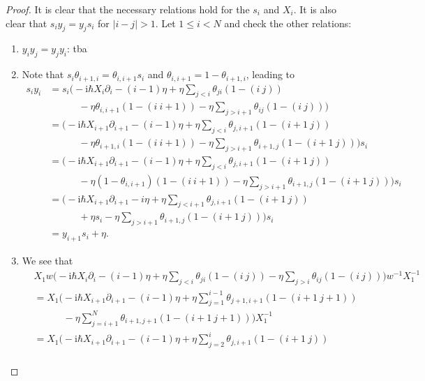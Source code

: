 \documentclass[11pt]{report}
\theoremstyle{definition}
\theoremstyle{remark}
\theoremstyle{remark}
\newcommand{\I}{\mathrm{i}}
\begin{document}
\begin{proof}
It is clear that the necessary relations hold for the $s_i$ and $X_i$. It is also clear that $s_i y_j = y_j s_i$ for $|i-j|>1$. Let $1 \leq i < N$ and check the other relations:
\begin{enumerate}[label=(\roman*)]
\item $y_i y_j = y_j y_i$: tba
\item Note that $s_i \theta_{i+1,i} = \theta_{i,i+1} s_i$ and $\theta_{i,i+1} = 1 - \theta_{i+1,i}$, leading to
\begin{align*}
s_i y_i
&= s_i \bigg( -\I \hbar X_i \partial_i - (i-1) \eta + \eta \sum_{j < i} \theta_{ji} (1-(i \ j)) \\
&\quad \quad \quad - \eta \theta_{i,i+1} (1-(i \ i+1)) - \eta \sum_{j > i+1} \theta_{ij} (1-(i \ j)) \bigg) \\
&= \bigg( -\I \hbar X_{i+1} \partial_{i+1} - (i-1) \eta + \eta \sum_{j < i} \theta_{j,i+1} (1-(i+1 \ j)) \\
&\quad \quad \quad - \eta \theta_{i+1,i} (1-(i \ i+1)) - \eta \sum_{j > i+1} \theta_{i+1,j} (1-(i+1 \ j)) \bigg) s_i \\
&= \bigg( -\I \hbar X_{i+1} \partial_{i+1} - (i-1) \eta + \eta \sum_{j < i} \theta_{j,i+1} (1-(i+1 \ j)) \\
&\quad \quad \quad - \eta (1-\theta_{i,i+1}) (1-(i \ i+1)) - \eta \sum_{j > i+1} \theta_{i+1,j} (1-(i+1 \ j)) \bigg) s_i \\
&= \bigg( -\I \hbar X_{i+1} \partial_{i+1} - i \eta + \eta \sum_{j < i+1} \theta_{j,i+1} (1-(i+1 \ j)) \\
&\quad \quad \quad + \eta s_i - \eta \sum_{j > i+1} \theta_{i+1,j} (1-(i+1 \ j)) \bigg) s_i \\
&= y_{i+1} s_i + \eta.
\end{align*}
\item We see that
\begin{align*}
&X_1 w \bigg( -\I \hbar X_i \partial_i - (i-1) \eta + \eta \sum_{j < i} \theta_{ji} (1-(i \ j)) - \eta \sum_{j > i} \theta_{ij} (1-(i \ j)) \bigg) w^{-1} X_1^{-1} \\
&= X_1 \bigg( -\I \hbar X_{i+1} \partial_{i+1} - (i-1) \eta + \eta \sum_{j=1}^{i-1} \theta_{j+1,i+1} (1-(i+1 \ j+1)) \\
&\quad \quad \quad - \eta \sum_{j=i+1}^N \theta_{i+1,j+1} (1-(i+1 \ j+1)) \bigg) X_1^{-1} \\
&= X_1 \bigg( -\I \hbar X_{i+1} \partial_{i+1} - (i-1) \eta + \eta \sum_{j=2}^{i} \theta_{j,i+1} (1-(i+1 \ j)) \\

\end{align*}
\end{enumerate}
\end{proof}
\end{document}
